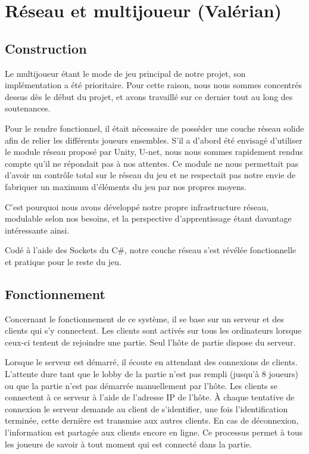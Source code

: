 \documentclass[12pt]{report}
\begin{document}
\section{Réseau et multijoueur (Valérian)}

\subsection{Construction}

Le multijoueur étant le mode de jeu principal de notre projet, son
implémentation a été prioritaire. Pour cette raison, nous nous sommes concentrés
dessus dès le début du projet, et avons travaillé sur ce dernier tout au long
des soutenances.

Pour le rendre fonctionnel, il était nécessaire de posséder une couche réseau
solide afin de relier les différents joueurs ensembles. S’il a d’abord été
envisagé d’utiliser le module réseau proposé par Unity, U-net, nous nous sommes
rapidement rendus compte qu’il ne répondait pas à nos attentes. Ce module ne
nous permettait pas d’avoir un contrôle total sur le réseau du jeu et ne
respectait pas notre envie de fabriquer un maximum d’éléments du jeu par nos
propres moyens. 

C’est pourquoi nous avons développé notre propre infrastructure réseau,
modulable selon nos besoins, et la perspective d’apprentissage étant davantage
intéressante ainsi.

Codé à l’aide des Sockets du C\#, notre couche réseau s’est révélée
fonctionnelle et pratique pour le reste du jeu.

\subsection{Fonctionnement}

Concernant le fonctionnement de ce système, il se base sur un serveur et des
clients qui s’y connectent. Les clients sont activés sur tous les ordinateurs
lorsque ceux-ci tentent de rejoindre une partie. Seul l’hôte de partie dispose
du serveur.

Lorsque le serveur est démarré, il écoute en attendant des connexions de
clients. L’attente dure tant que le lobby de la partie n’est pas rempli (jusqu’à
8 joueurs) ou que la partie n’est pas démarrée manuellement par l’hôte. Les
clients se connectent à ce serveur à l’aide de l’adresse IP de l’hôte. À chaque
tentative de connexion le serveur demande au client de s’identifier, une fois
l’identification terminée, cette dernière est transmise aux autres clients. En
cas de déconnexion, l’information est partagée aux clients encore en ligne. Ce
processus permet à tous les joueurs de savoir à tout moment qui est connecté
dans la partie.
\end{document}

